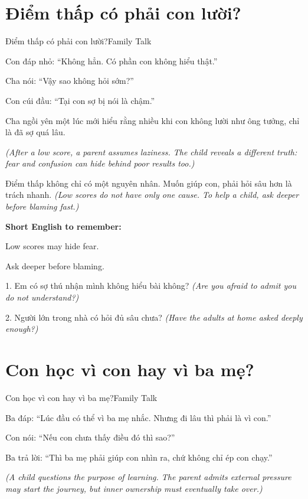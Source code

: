 \section{Điểm thấp có phải con lười?}
\begin{truyen}{Điểm thấp có phải con lười?}{Family Talk}

Con đáp nhỏ: ``Không hẳn. Có phần con không hiểu thật.''

Cha nói: ``Vậy sao không hỏi sớm?''

Con cúi đầu: ``Tại con sợ bị nói là chậm.''

Cha ngồi yên một lúc mới hiểu rằng nhiều khi con không lười như ông tưởng, chỉ là đã sợ quá lâu.

\textit{(After a low score, a parent assumes laziness. The child reveals a different truth: fear and confusion can hide behind poor results too.)}
\end{truyen}

\begin{baihoc}
Điểm thấp không chỉ có một nguyên nhân. Muốn giúp con, phải hỏi sâu hơn là trách nhanh.
\textit{(Low scores do not have only one cause. To help a child, ask deeper before blaming fast.)}
\end{baihoc}

\begin{ghinhoanh}
\textbf{Short English to remember:}

Low scores may hide fear.

Ask deeper before blaming.
\end{ghinhoanh}

\begin{tuhocnhanh}
1. Em có sợ thú nhận mình không hiểu bài không? \textit{(Are you afraid to admit you do not understand?)}

2. Người lớn trong nhà có hỏi đủ sâu chưa? \textit{(Have the adults at home asked deeply enough?)}
\end{tuhocnhanh}
\ngancach

\section{Con học vì con hay vì ba mẹ?}
\begin{truyen}{Con học vì con hay vì ba mẹ?}{Family Talk}

Ba đáp: ``Lúc đầu có thể vì ba mẹ nhắc. Nhưng đi lâu thì phải là vì con.''

Con nói: ``Nếu con chưa thấy điều đó thì sao?''

Ba trả lời: ``Thì ba mẹ phải giúp con nhìn ra, chứ không chỉ ép con chạy.''

\textit{(A child questions the purpose of learning. The parent admits external pressure may start the journey, but inner ownership must eventually take over.)}
\end{truyen}

